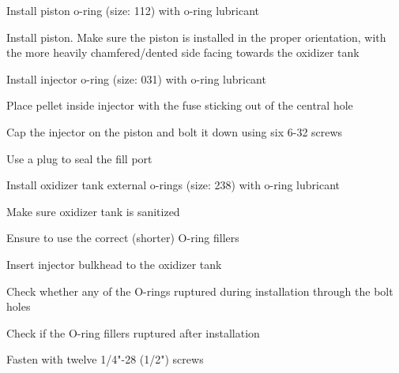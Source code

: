 \begin{checklist}
\begin{checklist}
            \item Install piston o-ring (size: 112) with o-ring lubricant
            \item Install piston. Make sure the piston is installed in the proper orientation, with the more heavily chamfered/dented side facing towards the oxidizer tank
            \item Install injector o-ring (size: 031) with o-ring lubricant
            \item Place pellet inside injector with the fuse sticking out of the central hole
            \item Cap the injector on the piston and bolt it down using six 6-32 screws
        \end{checklist} %
        \item Use a plug to seal the fill port
        \item Install oxidizer tank external o-rings (size: 238) with o-ring lubricant
        \item Make sure oxidizer tank is sanitized
        \item Ensure to use the correct (shorter) O-ring fillers
        \item Insert injector bulkhead to the oxidizer tank 
        \item Check whether any of the O-rings ruptured during installation through the bolt holes
        \item Check if the O-ring fillers ruptured after installation
        \item Fasten with twelve 1/4"-28 (1/2") screws

    \end{checklist} %
